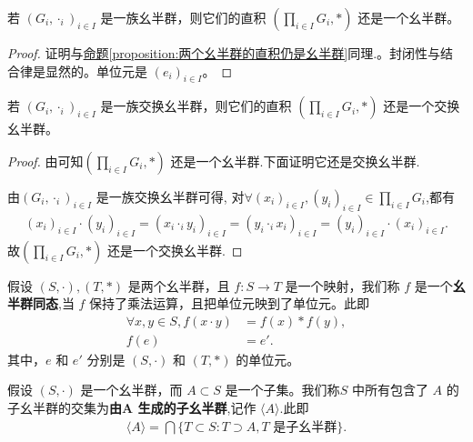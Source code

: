 \documentclass[../../main.tex]{subfiles}
\begin{document}
\begin{proposition}[一族幺半群的直积仍是幺半群]\label{proposition:一族幺半群的直积仍是幺半群}
若 $(G_i,\cdot_i)_{i\in I}$ 是一族幺半群，则它们的直积 $(\prod_{i\in I}G_i,*)$ 还是一个幺半群。  
\end{proposition}
\begin{proof}
证明与\hyperref[proposition:两个幺半群的直积仍是幺半群]{命题\ref{proposition:两个幺半群的直积仍是幺半群}}同理.。封闭性与结合律是显然的。单位元是 $(e_i)_{i\in I}$。 
\end{proof}

\begin{proposition}[一族交换幺半群的直积仍是交换幺半群]\label{proposition:一族交换幺半群的直积仍是交换幺半群}
若 $(G_i,\cdot_i)_{i\in I}$ 是一族交换幺半群，则它们的直积 $(\prod_{i\in I}G_i,*)$ 还是一个交换幺半群。  
\end{proposition}
\begin{proof}
由可知$(\prod_{i\in I}G_i,*)$ 还是一个幺半群.下面证明它还是交换幺半群.

由$(G_i,\cdot_i)_{i\in I}$ 是一族交换幺半群可得,
对$\forall (x_i)_{i\in I},(y_i)_{i\in I} \in \prod_{i\in I}G_i$,都有
\begin{align*}
\left( x_i \right) _{i\in I}\cdot \left( y_i \right) _{i\in I}=\left( x_i\cdot _iy_i \right) _{i\in I}=\left( y_i\cdot _ix_i \right) _{i\in I}=\left( y_i \right) _{i\in I}\cdot \left( x_i \right) _{i\in I}.
\end{align*}
故$(\prod_{i\in I}G_i,*)$ 还是一个交换幺半群.
\end{proof}

\begin{definition}[幺半群同态]
假设 $(S, \cdot), (T, *)$ 是两个幺半群，且 $f : S \to T$ 是一个映射，我们称 $f$ 是一个\textbf{幺半群同态},当 $f$ 保持了乘法运算，且把单位元映到了单位元。此即
\begin{align*}
\forall x, y \in S, f(x \cdot y) &= f(x) * f(y) ,\\
f(e) &= e'.
\end{align*}
其中，$e$ 和 $e'$ 分别是 $(S, \cdot)$ 和 $(T, *)$ 的单位元。 
\end{definition}

\begin{definition}[由子集生成的子幺半群]
假设 $(S, \cdot)$ 是一个幺半群，而 $A \subset S$ 是一个子集。我们称$S$ 中所有包含了 $A$ 的子幺半群的交集为\textbf{由$\boldsymbol{A}$ 生成的子幺半群},记作 $\langle A \rangle$.此即
\begin{align*}
\langle A \rangle = \bigcap \{T \subset S : T \supset A, T \text{ 是子幺半群}\}.
\end{align*} 
\end{definition}
\end{document}
